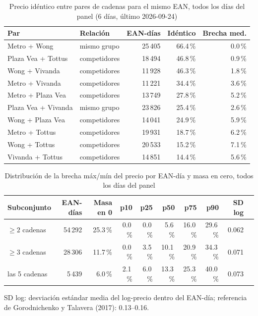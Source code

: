 
\begin{table}[htbp]
\caption{Precio id\'entico entre pares de cadenas para el mismo EAN, todos los d\'ias del panel (6 d\'ias, \'ultimo 2026-09-24)}
\label{tab:identidad}
\centering\scriptsize\setlength{\tabcolsep}{3pt}
\begin{tabular}{@{}llrrr@{}}
\toprule
Par & Relaci\'on & EAN-d\'ias & Id\'entico & Brecha med. \\
\midrule
Metro + Wong & mismo grupo & 25\,405 & 66.4\,\% & 0.0\,\% \\
Plaza Vea + Tottus & competidores & 18\,494 & 46.8\,\% & 0.9\,\% \\
Wong + Vivanda & competidores & 11\,928 & 46.3\,\% & 1.8\,\% \\
Metro + Vivanda & competidores & 11\,221 & 34.4\,\% & 3.6\,\% \\
Metro + Plaza Vea & competidores & 13\,749 & 27.8\,\% & 5.2\,\% \\
Plaza Vea + Vivanda & mismo grupo & 23\,826 & 25.4\,\% & 2.6\,\% \\
Wong + Plaza Vea & competidores & 14\,041 & 24.9\,\% & 5.9\,\% \\
Metro + Tottus & competidores & 19\,931 & 18.7\,\% & 6.2\,\% \\
Wong + Tottus & competidores & 20\,533 & 15.2\,\% & 7.1\,\% \\
Vivanda + Tottus & competidores & 14\,851 & 14.4\,\% & 5.6\,\% \\
\bottomrule\end{tabular}\end{table}

\begin{table}[t]
\caption{Distribuci\'on de la brecha m\'ax/m\'in del precio por EAN-d\'ia y masa en cero, todos los d\'ias del panel}
\label{tab:brecha}
\centering\scriptsize\setlength{\tabcolsep}{4pt}
\begin{tabular}{@{}lrrrrrrrrr@{}}
\toprule
Subconjunto & EAN-d\'ias & Masa en 0 & p10 & p25 & p50 & p75 & p90 & SD log \\
\midrule
$\geq 2$ cadenas & 54\,292 & 25.3\,\% & 0.0\,\% & 0.0\,\% & 5.6\,\% & 16.0\,\% & 29.6\,\% & 0.062 \\
$\geq 3$ cadenas & 28\,306 & 11.7\,\% & 0.0\,\% & 3.5\,\% & 10.1\,\% & 20.9\,\% & 34.3\,\% & 0.071 \\
las 5 cadenas & 5\,439 & 6.0\,\% & 2.1\,\% & 6.0\,\% & 13.3\,\% & 25.3\,\% & 40.0\,\% & 0.073 \\
\bottomrule\end{tabular}
\par\smallskip\raggedright\scriptsize SD log: desviaci\'on est\'andar media del log-precio dentro del EAN-d\'ia; referencia de Gorodnichenko y Talavera (2017): 0.13--0.16.
\end{table}

